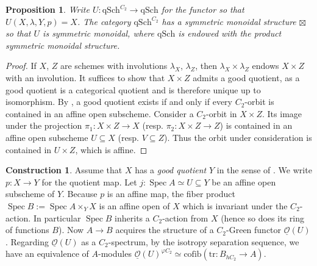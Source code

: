 \documentclass{article}
\DeclareMathOperator{\Spec}{Spec}
\newtheorem{proposition}[equation]{Proposition}
\theoremstyle{definition}
\newtheorem{construction}[equation]{Construction}
\begin{document}
\begin{proposition}
    Write $ U \colon \mathrm{qSch}^{C_2} \to \mathrm{qSch} $ for the functor so that $ U(X, \lambda, Y, p) = X $.  
    The category $ \mathrm{qSch}^{C_2} $ has a symmetric monoidal structure $ \boxtimes $ so that $ U $ is symmetric monoidal, where $ \mathrm{qSch} $ is endowed with the product symmetric monoidal structure. 
\end{proposition}
\begin{proof}
    If $ X $, $ Z $ are schemes with involutions $ \lambda_X $, $ \lambda_Z $, then $ \lambda_X \times \lambda_Z $ endows $ X \times Z $ with an involution. 
    It suffices to show that $ X \times Z $ admits a good quotient, as a good quotient is a categorical quotient and is therefore unique up to isomorphism. 
    By \cite[Remark 4.20]{azumaya_involution}, a good quotient exists if and only if every $ C_2 $-orbit is contained in an affine open subscheme. 
    Consider a $ C_2 $-orbit in $ X \times Z $. 
    Its image under the projection $ \pi_1 \colon X \times Z \to X $ (resp. $ \pi_2 \colon X \times Z \to Z $) is contained in an affine open subscheme $ U \subseteq X $ (resp. $ V \subseteq Z $). 
    Thus the orbit under consideration is contained in $ U \times Z $, which is affine. 
\end{proof}
\begin{construction}\label{cons:structure_sheaf_of_Green_functors}
    Assume that $ X $ has a \emph{good quotient} $ Y $ in the sense of \cite[Remark 4.20]{azumaya_involution}. 
    We write $ p \colon X \to Y $ for the quotient map.
    Let $ j \colon \Spec A  \simeq U \subseteq Y $ be an affine open subscheme of $ Y $. 
    Because $ p $ is an affine map, the fiber product $ \Spec B := \Spec A \times_{Y} X $ is an affine open of $ X $ which is invariant under the $ C_2 $-action. 
    In particular $ \Spec B $ inherits a $ C_2 $-action from $ X $ (hence so does its ring of functions $ B$).  
    Now $ A \to B $ acquires the structure of a $C_2$-Green functor $ \underline{\mathcal{O}}(U) $. 
    Regarding $ \underline{\mathcal{O}}(U) $ as a $ C_2 $-spectrum, by the isotropy separation sequence, we have an equivalence of $ A $-modules $ \underline{\mathcal{O}}(U)^{\varphi C_2} \simeq \mathrm{cofib} (\mathrm{tr} \colon B_{hC_2} \to A) $. 
\end{construction}
\end{document}
